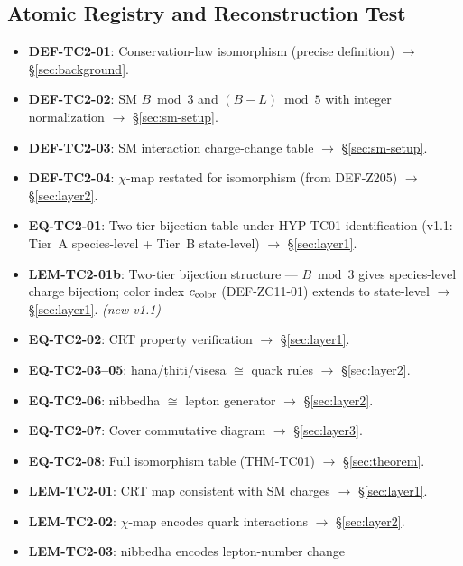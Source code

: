 \documentclass[12pt, a4paper]{article}
\begin{document}
\subsection{Atomic Registry and Reconstruction Test}
\label{sec:registry}

\begin{formalbox}[title={Atomic units introduced by TASK-ZC12}]
\begin{itemize}[leftmargin=*]
  \item \textbf{DEF-TC2-01}: Conservation-law isomorphism (precise definition)
    $\to$ \S\ref{sec:background}.
  \item \textbf{DEF-TC2-02}: SM $B\bmod 3$ and $(B-L)\bmod 5$ with
    integer normalization $\to$ \S\ref{sec:sm-setup}.
  \item \textbf{DEF-TC2-03}: SM interaction charge-change table
    $\to$ \S\ref{sec:sm-setup}.
  \item \textbf{DEF-TC2-04}: $\chi$-map restated for isomorphism
    (from DEF-Z205) $\to$ \S\ref{sec:layer2}.
  \item \textbf{EQ-TC2-01}: Two-tier bijection table under HYP-TC01
    identification (v1.1: Tier~A species-level + Tier~B state-level)
    $\to$ \S\ref{sec:layer1}.
  \item \textbf{LEM-TC2-01b}: Two-tier bijection structure ---
    $B\bmod 3$ gives species-level charge bijection; color index
    $c_{\rm color}$ (DEF-ZC11-01) extends to state-level
    $\to$ \S\ref{sec:layer1}. \textit{(new v1.1)}
  \item \textbf{EQ-TC2-02}: CRT property verification
    $\to$ \S\ref{sec:layer1}.
  \item \textbf{EQ-TC2-03--05}: hāna/ṭhiti/visesa $\cong$ quark rules
    $\to$ \S\ref{sec:layer2}.
  \item \textbf{EQ-TC2-06}: nibbedha $\cong$ lepton generator
    $\to$ \S\ref{sec:layer2}.
  \item \textbf{EQ-TC2-07}: Cover commutative diagram
    $\to$ \S\ref{sec:layer3}.
  \item \textbf{EQ-TC2-08}: Full isomorphism table (THM-TC01)
    $\to$ \S\ref{sec:theorem}.
  \item \textbf{LEM-TC2-01}: CRT map consistent with SM charges
    $\to$ \S\ref{sec:layer1}.
  \item \textbf{LEM-TC2-02}: $\chi$-map encodes quark interactions
    $\to$ \S\ref{sec:layer2}.
  \item \textbf{LEM-TC2-03}: nibbedha encodes lepton-number change

\end{itemize}
\end{formalbox}
\end{document}

